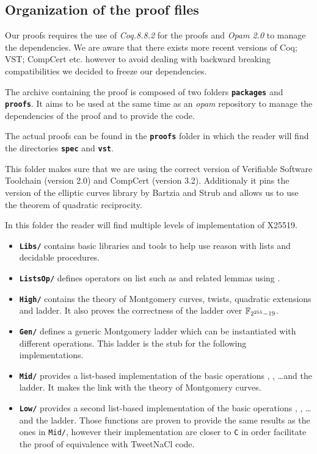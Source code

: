 \subsection{Organization of the proof files}
\label{appendix:proof-folders}

Our proofs requires the use of \emph{Coq.8.8.2} for the proofs and
\emph{Opam 2.0} to manage the dependencies. We are aware that there exists more
recent versions of Coq; VST; CompCert etc. however to avoid dealing with backward
breaking compatibilities we decided to freeze our dependencies.

The archive containing the proof is composed of two folders \textbf{\texttt{packages}}
and \textbf{\texttt{proofs}}.
It aims to be used at the same time as an \emph{opam} repository to manage
the dependencies of the proof and to provide the code.

The actual proofs can be found in the \textbf{\texttt{proofs}} folder in which
the reader will find the directories \textbf{\texttt{spec}} and \textbf{\texttt{vst}}.

This folder makes sure that we are using the correct version of
Verifiable Software Toolchain (version 2.0) and CompCert (version 3.2).
Additionaly it pins the version of the elliptic curves library by Bartzia and Strub
and allows us to use the theorem of quadratic reciprocity.

In this folder the reader will find multiple levels of implementation of X25519.
\begin{itemize}
  \item \textbf{\texttt{Libs/}} contains basic libraries and tools to help use
  reason with lists and decidable procedures.
  \item \textbf{\texttt{ListsOp/}} defines operators on list such as
   and related lemmas using \eg {}.
  \item \textbf{\texttt{High/}} contains the theory of Montgomery curves,
  twists, quadratic extensions and ladder.
  It also proves the correctness of the ladder over $\mathbb{F}_{2^{255}-19}$.
  \item \textbf{\texttt{Gen/}} defines a generic Montgomery ladder which can be
  instantiated with different operations. This ladder is the stub for the
  following implementations.
  \item \textbf{\texttt{Mid/}} provides a list-based implementation of the
  basic operations , ,  \ldots and the ladder. It
  makes the link with the theory of Montgomery curves.
  \item \textbf{\texttt{Low/}} provides a second list-based implementation of
  the basic operations , ,  \ldots and the ladder.
  Those functions are proven to provide the same results as the ones in
  \texttt{Mid/}, however their implementation are closer to \texttt{C} in order
  facilitate the proof of equivalence with TweetNaCl code.
\end{itemize}

